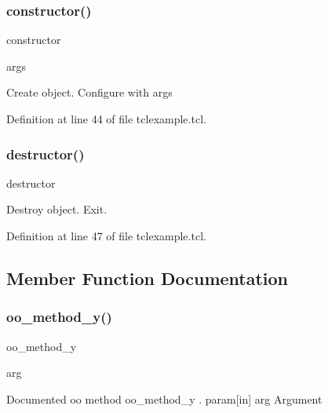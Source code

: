 \subsubsection{\texorpdfstring{constructor()}{constructor()}}
{\footnotesize\ttfamily constructor\begin{DoxyParamCaption}\item[{}]{args  }\end{DoxyParamCaption}}

Create object. Configure with args 

Definition at line 44 of file tclexample.\+tcl.

\mbox{\label{classns_1_1oo__class_aa04747d49a3a74e75fcfdaf017a73877}} 
\subsubsection{\texorpdfstring{destructor()}{destructor()}}
{\footnotesize\ttfamily destructor}

Destroy object. Exit. 

Definition at line 47 of file tclexample.\+tcl.



\subsection{Member Function Documentation}
\mbox{\label{classns_1_1oo__class_a93b2189732a4ddb6583f19c1a4406e10}} 
\subsubsection{\texorpdfstring{oo\+\_\+method\+\_\+y()}{oo\_method\_y()}}
{\footnotesize\ttfamily oo\+\_\+method\+\_\+y\begin{DoxyParamCaption}\item[{}]{arg  }\end{DoxyParamCaption}\hspace{0.3cm}{\ttfamily [protected]}}

Documented oo method {\ttfamily oo\+\_\+method\+\_\+y} . param\mbox{[}in\mbox{]} arg Argument 

